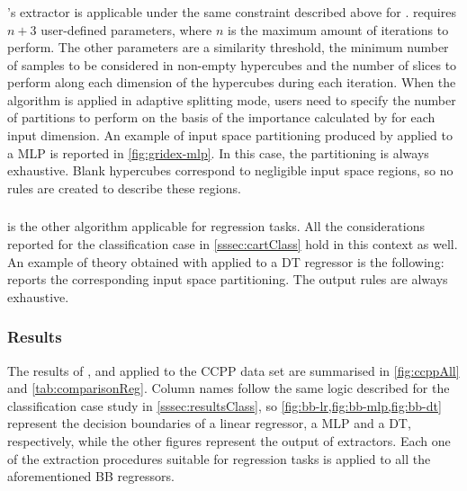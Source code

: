 \documentclass[12pt,a4paper,openright,twoside]{book}
\begin{document}
\subsubsection{\gridex{}}

\psyke{}'s \gridex{} extractor is applicable under the same constraint described above for \iter{}.
%
\gridex{} requires $n + 3$ user-defined parameters, where $n$ is the maximum amount of iterations to perform.
%
The other parameters are a similarity threshold, the minimum number of samples to be considered in non-empty hypercubes and the number of slices to perform along each dimension of the hypercubes during each iteration.
%
When the algorithm is applied in adaptive splitting mode, users need to specify the number of partitions to perform on the basis of the importance calculated by \gridex{} for each input dimension.
%
An example of input space partitioning produced by \gridex{} applied to a MLP is reported in \cref{fig:gridex-mlp}.
%
In this case, the partitioning is always exhaustive.
%
Blank hypercubes correspond to negligible input space regions, so no rules are created to describe these regions.

\subsubsection{\cart{}}

\cart{} is the other \psyke{} algorithm applicable for regression tasks.
%
All the considerations reported for the classification case in \cref{sssec:cartClass} hold in this context as well.
%
An example of theory obtained with \cart{} applied to a DT regressor is the following:
%
%
 reports the corresponding input space partitioning.
%
The output rules are always exhaustive.

\subsubsection{Results}





The results of \iter{}, \gridex{} and \cart{} applied to the CCPP data set are summarised in \cref{fig:ccppAll} and \cref{tab:comparisonReg}.
%
Column names follow the same logic described for the classification case study in \cref{sssec:resultsClass}, so \cref{fig:bb-lr,fig:bb-mlp,fig:bb-dt} represent the decision boundaries of a linear regressor, a MLP and a DT, respectively, while the other figures represent the output of \psyke{} extractors.
%
Each one of the extraction procedures suitable for regression tasks is applied to all the aforementioned BB regressors.
\end{document}
